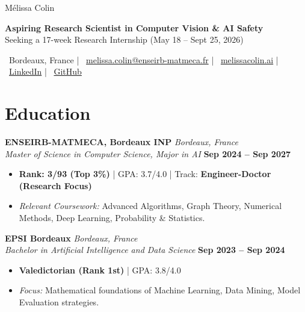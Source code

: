 \documentclass[10pt, letterpaper]{article}
\newenvironment{header}{
    \setlength{\topsep}{0pt}\par\kern\topsep\centering\linespread{1.5}
}{
    \par\kern\topsep
}
\begin{document}
    \begin{header}
        \fontsize{25 pt}{25 pt}\selectfont Mélissa Colin

        \vspace{5 pt}

        \normalsize
        \fontsize{11 pt}{11 pt}\selectfont 
        \textbf{Aspiring Research Scientist in Computer Vision \& AI Safety}\\
        Seeking a 17-week Research Internship (May 18 -- Sept 25, 2026)
        
        \vspace{5pt}
        \small
        \faMapMarker*~Bordeaux, France \quad | \quad 
        \faEnvelope~\href{mailto:melissa.colin@enseirb-matmeca.fr}{melissa.colin@enseirb-matmeca.fr} \quad | \quad 
        \faGlobe~\href{https://melissacolin.ai}{melissacolin.ai} \quad | \quad 
        \faLinkedin~\href{https://www.linkedin.com/in/m%C3%A9lissa-colin/}{LinkedIn} \quad | \quad 
        \faGithub~\href{https://github.com/melissa-colin}{GitHub}
    \end{header}

    \vspace{0.2cm}

    \section{Education}
    
    \textbf{ENSEIRB-MATMECA, Bordeaux INP} \hfill \textit{Bordeaux, France} \\
    \textit{Master of Science in Computer Science, Major in AI} \hfill \textbf{Sep 2024 -- Sep 2027} \\
    \begin{itemize}[topsep=0pt, itemsep=1pt, parsep=0pt, leftmargin=15pt]
        \item \textbf{Rank: 3/93 (Top 3\%)} | GPA: 3.7/4.0 | Track: \textbf{Engineer-Doctor (Research Focus)}
        \item \textit{Relevant Coursework:} Advanced Algorithms, Graph Theory, Numerical Methods, Deep Learning, Probability \& Statistics.
    \end{itemize}

    \vspace{0.2cm}

    \textbf{EPSI Bordeaux} \hfill \textit{Bordeaux, France} \\
    \textit{Bachelor in Artificial Intelligence and Data Science} \hfill \textbf{Sep 2023 -- Sep 2024} \\
    \begin{itemize}[topsep=0pt, itemsep=1pt, parsep=0pt, leftmargin=15pt]
        \item \textbf{Valedictorian (Rank 1st)} | GPA: 3.8/4.0
        \item \textit{Focus:} Mathematical foundations of Machine Learning, Data Mining, Model Evaluation strategies.
    \end{itemize}
\end{document}
